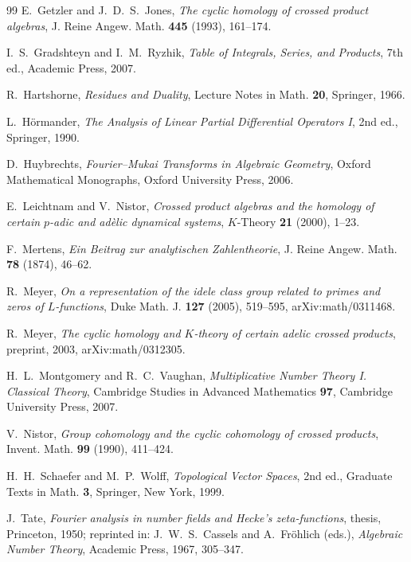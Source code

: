 \documentclass[11pt]{amsart}
\theoremstyle{definition}
\theoremstyle{remark}
\begin{document}
\begin{thebibliography}{99}
E.~Getzler and J.~D.~S.~Jones, \emph{The cyclic homology of crossed product
algebras}, J. Reine Angew. Math. \textbf{445} (1993), 161--174.

I.~S.~Gradshteyn and I.~M.~Ryzhik, \emph{Table of Integrals, Series, and
Products}, 7th ed., Academic Press, 2007.

R.~Hartshorne, \emph{Residues and Duality}, Lecture Notes in Math.
\textbf{20}, Springer, 1966.

L.~H\"ormander, \emph{The Analysis of Linear Partial Differential Operators
I}, 2nd ed., Springer, 1990.

D.~Huybrechts, \emph{Fourier--Mukai Transforms in Algebraic Geometry}, Oxford
Mathematical Monographs, Oxford University Press, 2006.

E.~Leichtnam and V.~Nistor, \emph{Crossed product algebras and the homology
of certain $p$-adic and ad\`elic dynamical systems}, $K$-Theory \textbf{21}
(2000), 1--23.

F.~Mertens, \emph{Ein Beitrag zur analytischen Zahlentheorie},
J. Reine Angew. Math. \textbf{78} (1874), 46--62.

R.~Meyer, \emph{On a representation of the idele class group related to
primes and zeros of $L$-functions}, Duke Math. J. \textbf{127} (2005),
519--595, arXiv:math/0311468.

R.~Meyer, \emph{The cyclic homology and $K$-theory of certain adelic crossed
products}, preprint, 2003, arXiv:math/0312305.

H.~L.~Montgomery and R.~C.~Vaughan, \emph{Multiplicative Number Theory I.
Classical Theory}, Cambridge Studies in Advanced Mathematics \textbf{97},
Cambridge University Press, 2007.

V.~Nistor, \emph{Group cohomology and the cyclic cohomology of crossed
products}, Invent. Math. \textbf{99} (1990), 411--424.

H.~H.~Schaefer and M.~P.~Wolff, \emph{Topological Vector Spaces}, 2nd ed.,
Graduate Texts in Math. \textbf{3}, Springer, New York, 1999.

J.~Tate, \emph{Fourier analysis in number fields and Hecke's
zeta-functions}, thesis, Princeton, 1950; reprinted in: J.~W.~S.~Cassels and
A.~Fr\"ohlich (eds.), \emph{Algebraic Number Theory}, Academic Press, 1967,
305--347.


\end{thebibliography}
\end{document}
